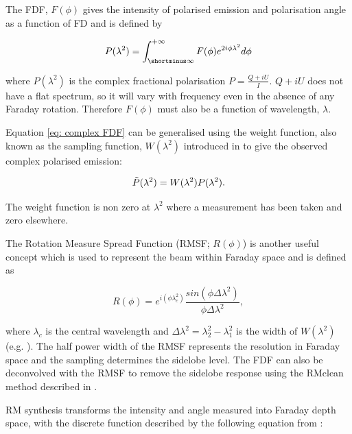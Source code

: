 The FDF, $F(\phi)$ gives the intensity of polarised emission and polarisation angle as a function of FD and is defined by 

\begin{equation}
    P(\lambda^2) = \int_{\shortminus\infty}^{+\infty} F(\phi) e^{2i\phi\lambda^2}\space d\phi
    \label{eq: complex FDF}
\end{equation}

\noindent where $P(\lambda^2)$ is the complex fractional polarisation $P=\frac{Q+iU}{I}$. $Q+iU$ does not have a flat spectrum, so it will vary with frequency even in the absence of any Faraday rotation. Therefore $F(\phi)$ must also be a function of wavelength, $\lambda$. 

Equation \ref{eq: complex FDF} can be generalised using the weight function, also known as the sampling function, $W(\lambda^2)$ introduced in \cite{Brentjens_2005} to give the observed complex polarised emission:


\begin{equation}
    \Tilde{P}(\lambda^2) = W(\lambda^2)P(\lambda^2).
\end{equation}

\noindent The weight function is non zero at $\lambda^2$ where a measurement has been taken and zero elsewhere.

The Rotation Measure Spread Function (RMSF; $R(\phi)$) is another useful concept which is used to represent the beam within Faraday space and is defined as

\begin{equation}
    R(\phi) = e^{i(\phi\lambda_c^2)}\frac{sin(\phi\Delta\lambda^2)}{\phi\Delta\lambda^2},
    \label{eq: RMSF}
\end{equation}


\noindent where $\lambda_c$ is the central wavelength and $\Delta\lambda^2 = \lambda_2^2-\lambda_1^2$ is the width of $W(\lambda^2)$ (e.g. \cite{Dickey_2019}). The half power width of the RMSF represents the resolution in Faraday space and the sampling determines the sidelobe level. The FDF can also be deconvolved with the RMSF to remove the sidelobe response using the RMclean method described in \cite{Heald_2009}.

RM synthesis transforms the intensity and angle measured into Faraday depth space, with the discrete function described by the following equation from \cite{Brentjens_2005}:

